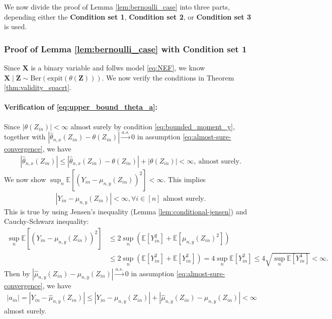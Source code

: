 \documentclass[12pt]{article}
\theoremstyle{definition}
\newcommand{\E}{\mathbb E}								%
\newcommand{\expit}{\mathrm{expit}}                 	%
\newcommand{\prx}{\bm X}								%
\newcommand{\prz}{\bm Z}								%
\newcommand{\srz}{Z}									%
\newcommand{\sry}{Y}									%
\begin{document}
We now divide the proof of Lemma \ref{lem:bernoulli_case} into three parts, depending either the \textbf{Condition set 1}, \textbf{Condition set 2}, or \textbf{Condition set 3} is used.


\subsubsection{Proof of Lemma \ref{lem:bernoulli_case} with \textbf{Condition set 1}}

Since $\prx$ is a binary variable and follws model \eqref{eq:NEF}, we know $\prx\mid\prz \sim \mathrm{Ber}(\expit(\theta(\prz)))$. We now verify the conditions in Theorem \ref{thm:validity_spacrt}.

	\paragraph{Verification of \eqref{eq:upper_bound_theta_a}:}
  Since $|\theta(\srz_{in})|<\infty$ almost surely by condition \eqref{eq:bounded_moment_y}, together with $|\widehat \theta_{n,x}(\srz_{in})-\theta(\srz_{in})|\overset{a.s.}{\rightarrow}0$ in assumption \eqref{eq:almost-sure-convergence}, we have
	\begin{align*}
		|\widehat \theta_{n,x}(\srz_{in})|\leq |\widehat \theta_{n,x}(\srz_{in})-\theta(\srz_{in})|+|\theta(\srz_{in})|<\infty,\ \text{almost surely}.
	\end{align*}
	We now show $\sup_n\E[(\sry_{in}-\mu_{n,y}(\srz_{in}))^2]<\infty$. This implies 
	\begin{align}\label{eq:bounded_y}
		|\sry_{in}-\mu_{n,y}(\srz_{in})|<\infty,\forall i\in [n]\text{ almost surely}.
	\end{align}
	This is true by using Jensen's inequality (Lemma \ref{lem:conditional-jensen}) and Cauchy-Schwarz inequality:
	\begin{align*}
		\sup_n\E[(\sry_{in}-\mu_{n,y}(\srz_{in}))^2]
		&
		\leq 2\sup_n(\E[\sry_{in}^2]+\E[\mu_{n,y}(\srz_{in})^2])\\
		&
		\leq 2\sup_n(\E[\sry_{in}^2]+\E[\sry_{in}^2])=4\sup_n\E[\sry_{in}^2]\leq 4\sqrt{\sup_n\E[\sry_{in}^4]}<\infty.
	\end{align*}
	Then by $|\widehat{\mu}_{n,y}(\srz_{in})-\mu_{n,y}(\srz_{in})|\overset{a.s.}{\rightarrow}0$ in assumption \eqref{eq:almost-sure-convergence}, we have 
	\begin{align*}
		|a_{in}|=|\sry_{in}-\widehat{\mu}_{n,y}(\srz_{in})|\leq |\sry_{in}-\mu_{n,y}(\srz_{in})|+ |\widehat{\mu}_{n,y}(\srz_{in})-\mu_{n,y}(\srz_{in})|<\infty
	\end{align*}
	almost surely. 
\end{document}
